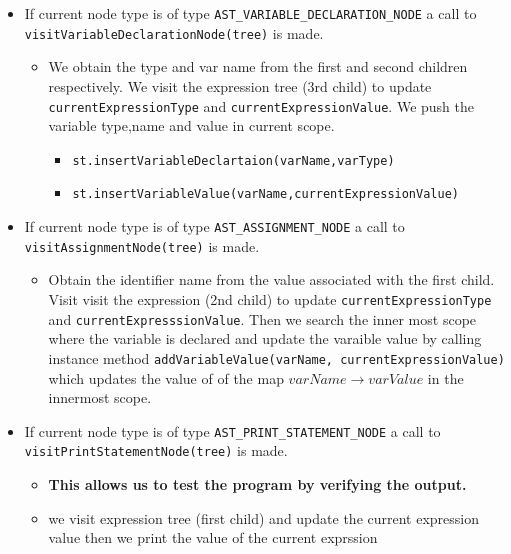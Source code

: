 \begin{itemize}
    \item If current node type is of type \verb!AST_VARIABLE_DECLARATION_NODE! a call to \verb!visitVariableDeclarationNode(tree)! is made.
    \begin{itemize}
        \item We obtain the type and var name from the first  and second children respectively. We visit the expression tree (3rd child) to update \verb!currentExpressionType!  and \verb!currentExpressionValue!. We push the variable type,name and value in current scope.
        \begin{itemize}
            \item \verb!st.insertVariableDeclartaion(varName,varType)!
            \item \verb!st.insertVariableValue(varName,currentExpressionValue)!
        \end{itemize}
    \end{itemize}
        \item If current node type is of type \verb!AST_ASSIGNMENT_NODE! a call to \verb!visitAssignmentNode(tree)! is made.
        \begin{itemize}
            \item Obtain the identifier name from the value associated with the first child. Visit visit the expression (2nd child) to update \verb!currentExpressionType! and \verb!currentExpresssionValue!. Then we search the inner most scope where the variable is declared and update the varaible value by calling instance method
            \verb!addVariableValue(varName, currentExpressionValue)! which updates the value of of the map $varName \rightarrow varValue$ in the innermost scope.
        \end{itemize}
    \item If current node type is of type \verb!AST_PRINT_STATEMENT_NODE! a call to \verb!visitPrintStatementNode(tree)! is made. 
    \begin{itemize}
        \item \textbf{This allows us to test the program by verifying the output.}
        \item we visit expression tree (first child) and update the current expression value then we print the value of the current exprssion
        

\end{itemize}
\end{itemize}

